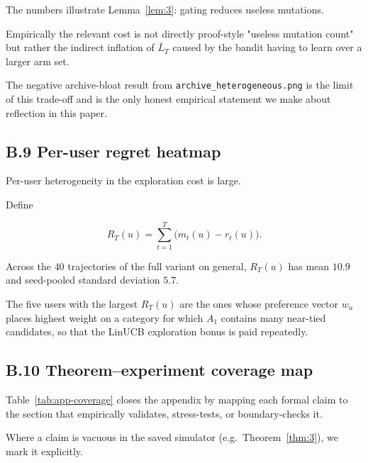 \documentclass{article} %
\begin{document}
The numbers illustrate Lemma~\ref{lem:3}: gating reduces useless mutations.

Empirically the relevant cost is not directly proof-style "useless mutation count" but rather the indirect inflation of $\bar{L}_T$ caused by the bandit having to learn over a larger arm set.

The negative archive-bloat result from \texttt{archive\_heterogeneous.png} is the limit of this trade-off and is the only honest empirical statement we make about reflection in this paper.

\subsection{B.9 Per-user regret heatmap}

\label{app:per-user-regret}

Per-user heterogeneity in the exploration cost is large.

Define

\begin{equation}
\label{eq:app-per-user-regret}
R_T(u) = \sum_{t=1}^{T}\big(m_t(u)-r_t(u)\big).
\end{equation}

Across the $40$ trajectories of the full variant on general, $R_T(u)$ has mean $10.9$ and seed-pooled standard deviation $5.7$.

The five users with the largest $R_T(u)$ are the ones whose preference vector $w_u$ places highest weight on a category for which $A_1$ contains many near-tied candidates, so that the LinUCB exploration bonus is paid repeatedly.

\subsection{B.10 Theorem--experiment coverage map}

\label{app:coverage-map}

Table~\ref{tab:app-coverage} closes the appendix by mapping each formal claim to the section that empirically validates, stress-tests, or boundary-checks it.

Where a claim is vacuous in the saved simulator (e.g.\ Theorem~\ref{thm:3}), we mark it explicitly.
\end{document}
